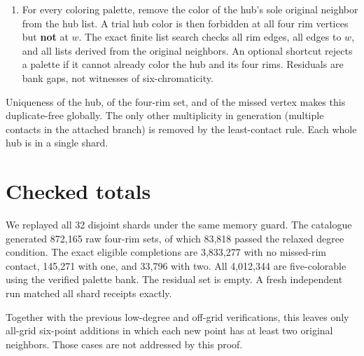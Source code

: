 \documentclass[11pt,letterpaper]{article}
\providecommand{\tightlist}{\setlength{\itemsep}{0pt}\setlength{\parskip}{0pt}}
\begin{document}
\begin{enumerate}
  \begin{itemize}
  \tightlist
  \item
    \textbf{Zero.} No required contacts, \(b(w)\ge5\), and \(w\) is not
    adjacent to any rim or to \(h\), or equal to any selected point.
    Static bitsets range over the 574 \(b\ge5\) points. Subtract the hub
    neighbors and the rim points and their neighbors; this counts every
    valid isolated completion exactly once. For a given proper base
    palette, the bitset of isolated sites with a nonempty list is
    precomputed. The union of those bitsets over palettes that color the
    hub plus its four rims gives exactly the covered isolated
    completions.
  \item
    \textbf{One or two.} Enumerate the union of neighbor sets of the
    four rims restricted to \(b\ge3\). For a candidate \(w\), compute
    the complete four-bit contact mask by exact step lookup; visit it
    only from the least contacted rim index. Reject if it sees \(h\),
    equals a selected point, misses a required contact, or has
    \(b(w)+t<5\). This produces each valid one-contact or two-contact
    completion exactly once.
  \end{itemize}
\item
  For every coloring palette, remove the color of the hub's sole
  original neighbor from the hub list. A trial hub color is then
  forbidden at all four rim vertices but \textbf{not} at \(w\). The
  exact finite list search checks all rim edges, all edges to \(w\), and
  all lists derived from the original neighbors. An optional shortcut
  rejects a palette if it cannot already color the hub and its four
  rims. Residuals are bank gaps, not witnesses of six-chromaticity.
\end{enumerate}

Uniqueness of the hub, of the four-rim set, and of the missed vertex
makes this duplicate-free globally. The only other multiplicity in
generation (multiple contacts in the attached branch) is removed by the
least-contact rule. Each whole hub is in a single shard.

\section{Checked totals}
We replayed all 32 disjoint shards under the same memory guard.
The catalogue generated 872,165 raw four-rim sets, of which 83,818
passed the relaxed degree condition. The exact eligible completions
are 3,833,277 with no missed-rim contact, 145,271 with one, and
33,796 with two. All 4,012,344 are five-colorable using the verified
palette bank. The residual set is empty. A fresh independent run
matched all shard receipts exactly.
\par
Together with the previous low-degree and off-grid verifications,
this leaves only all-grid six-point additions in which each new
point has at least two original neighbors. Those cases are not
addressed by this proof.
\end{document}

